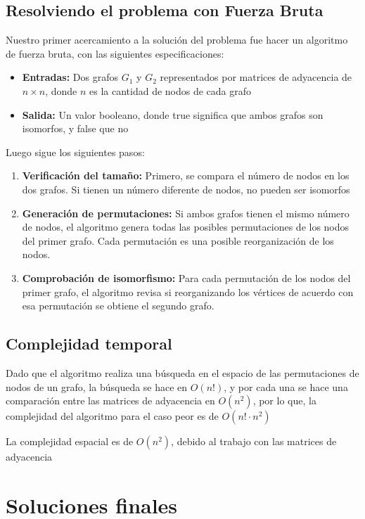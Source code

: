 \documentclass{article}
\begin{document}
\subsection{Resolviendo el problema con Fuerza Bruta}

Nuestro primer acercamiento a la solución del problema fue hacer un algoritmo de fuerza bruta, con las siguientes especificaciones:
\begin{itemize}
\item {\textbf{Entradas:} Dos grafos $G_1$ y $G_2$ representados por matrices de adyacencia de $n \times n$, donde $n$ es la cantidad de nodos de cada grafo}
\item {\textbf{Salida:} Un valor booleano, donde true significa que ambos grafos son isomorfos, y false que no}
\end{itemize}

Luego sigue los siguientes pasos:
\begin{enumerate}
\item {\textbf{Verificación del tamaño:} Primero, se compara el número de nodos en los dos grafos. Si tienen un número diferente de nodos, no pueden ser isomorfos}
\item {\textbf {Generación de permutaciones:} Si ambos grafos tienen el mismo número de nodos, el algoritmo genera todas las posibles permutaciones de los nodos del primer grafo. Cada permutación es una posible reorganización de los nodos.}
\item {\textbf{Comprobación de isomorfismo:} Para cada permutación de los nodos del primer grafo, el algoritmo revisa si reorganizando los vértices de acuerdo con esa permutación se obtiene el segundo grafo.}
\end{enumerate}

\subsection{Complejidad temporal}
Dado que el algoritmo realiza una búsqueda en el espacio de las permutaciones de nodos de un grafo, la búsqueda se hace en $O(n!)$, y por cada una se hace una comparación entre las matrices de adyacencia en $O(n^2)$, por lo que, la complejidad del algoritmo para el caso peor es de $O(n! \cdot n^2)$

La complejidad espacial es de $O(n^2)$, debido al trabajo con las matrices de adyacencia

\section{Soluciones finales}
\end{document}

